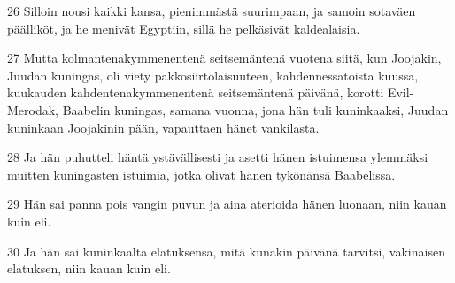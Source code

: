 \par 26 Silloin nousi kaikki kansa, pienimmästä suurimpaan, ja samoin sotaväen päälliköt, ja he menivät Egyptiin, sillä he pelkäsivät kaldealaisia.
\par 27 Mutta kolmantenakymmenentenä seitsemäntenä vuotena siitä, kun Joojakin, Juudan kuningas, oli viety pakkosiirtolaisuuteen, kahdennessatoista kuussa, kuukauden kahdentenakymmenentenä seitsemäntenä päivänä, korotti Evil-Merodak, Baabelin kuningas, samana vuonna, jona hän tuli kuninkaaksi, Juudan kuninkaan Joojakinin pään, vapauttaen hänet vankilasta.
\par 28 Ja hän puhutteli häntä ystävällisesti ja asetti hänen istuimensa ylemmäksi muitten kuningasten istuimia, jotka olivat hänen tykönänsä Baabelissa.
\par 29 Hän sai panna pois vangin puvun ja aina aterioida hänen luonaan, niin kauan kuin eli.
\par 30 Ja hän sai kuninkaalta elatuksensa, mitä kunakin päivänä tarvitsi, vakinaisen elatuksen, niin kauan kuin eli.


